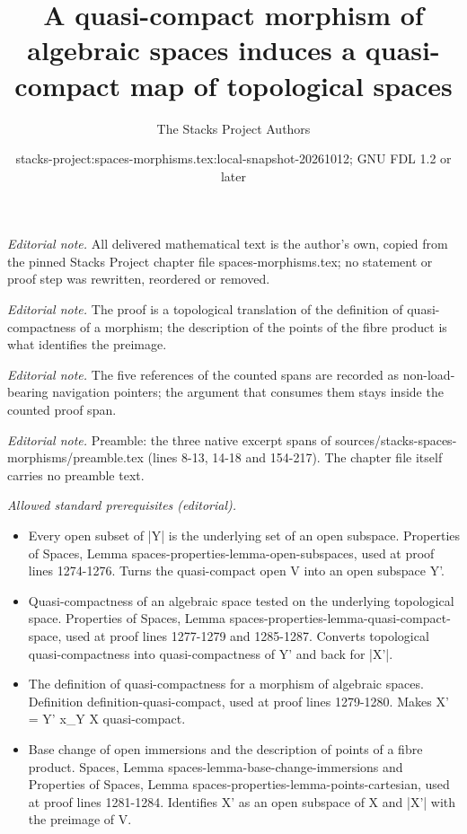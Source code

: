 \documentclass[10pt,a4paper]{amsart}
\title{A quasi-compact morphism of algebraic spaces induces a quasi-compact map of topological spaces}
\author{The Stacks Project Authors}
\date{stacks-project:spaces-morphisms.tex:local-snapshot-20261012; GNU FDL 1.2 or later}
\theoremstyle{plain}
\theoremstyle{definition}
\theoremstyle{remark}
\numberwithin{equation}{subsection}
\begin{document}
\maketitle
\setcounter{subsection}{1}
\noindent\textit{Editorial note.} All delivered mathematical text is the author's own, copied from the pinned Stacks Project chapter file spaces-morphisms.tex; no statement or proof step was rewritten, reordered or removed.\par\medskip
\noindent\textit{Editorial note.} The proof is a topological translation of the definition of quasi-compactness of a morphism; the description of the points of the fibre product is what identifies the preimage.\par\medskip
\noindent\textit{Editorial note.} The five references of the counted spans are recorded as non-load-bearing navigation pointers; the argument that consumes them stays inside the counted proof span.\par\medskip
\noindent\textit{Editorial note.} Preamble: the three native excerpt spans of sources/stacks-spaces-morphisms/preamble.tex (lines 8-13, 14-18 and 154-217). The chapter file itself carries no preamble text.\par\medskip
\noindent\textit{Allowed standard prerequisites (editorial).}\begin{itemize}
\item Every open subset of |Y| is the underlying set of an open subspace. Properties of Spaces, Lemma spaces-properties-lemma-open-subspaces, used at proof lines 1274-1276. Turns the quasi-compact open V into an open subspace Y'.
\item Quasi-compactness of an algebraic space tested on the underlying topological space. Properties of Spaces, Lemma spaces-properties-lemma-quasi-compact-space, used at proof lines 1277-1279 and 1285-1287. Converts topological quasi-compactness into quasi-compactness of Y' and back for |X'|.
\item The definition of quasi-compactness for a morphism of algebraic spaces. Definition definition-quasi-compact, used at proof lines 1279-1280. Makes X' = Y' x\_Y X quasi-compact.
\item Base change of open immersions and the description of points of a fibre product. Spaces, Lemma spaces-lemma-base-change-immersions and Properties of Spaces, Lemma spaces-properties-lemma-points-cartesian, used at proof lines 1281-1284. Identifies X' as an open subspace of X and |X'| with the preimage of V.
\end{itemize}\medskip
\end{document}

